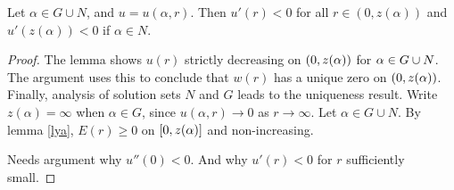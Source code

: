 \newpage
\begin{lemma}
  Let $\alpha\in G\cup N$, and $u=u(\alpha,r)$.
  Then $u'(r)<0$ for all $r\in(0,z(\alpha))$ and $u'(z(\alpha))<0$ if $\alpha\in N$.

\begin{proof}
The lemma shows $u(r)$ strictly decreasing on $(0,z(\alpha))$ for $\alpha\in G\cup N$. The argument uses this to conclude that $w(r)$ has a unique zero on $(0,z(\alpha))$. Finally, analysis of solution sets $N$ and $G$ leads to the uniqueness result.
Write $z(\alpha)=\infty$ when $\alpha\in G$, since $u(\alpha,r)\to0$ as $r\to\infty$.
Let $\alpha\in G\cup N$.
By lemma \ref{lya}, $E(r)\geq0$ on $[0,z(\alpha)]$ and non-increasing.


{\color{red} Needs argument why $u''(0)<0$. And why $u'(r)<0$ for $r$ sufficiently small.}





\end{proof}
\end{lemma}

